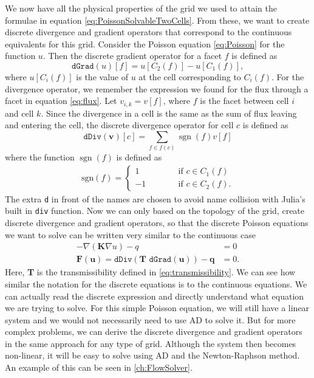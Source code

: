 We now have all the physical properties of the grid we used to attain the formulae in equation \eqref{eq:PoissonSolvableTwoCells}. From these, we want to create discrete divergence and gradient operators that correspond to the continuous equivalents for this grid. Consider the Poisson equation \eqref{eq:Poisson} for the function $u$. Then the discrete gradient operator for a facet $f$ is defined as 
\begin{equation}
    \texttt{dGrad}(u)[f] = u[C_2(f)] - u[C_1(f)], 
    \label{eq:discreteGradient}
\end{equation}
where $u[C_i(f)]$ is the value of $u$ at the cell corresponding to $C_i(f)$. For the divergence operator, we remember the expression we found for the flux through a facet in equation \eqref{eq:flux}. Let $v_{i,k} = v[f]$, where $f$ is the facet between cell $i$ and cell $k$. Since the divergence in a cell is the same as the sum of flux leaving and entering the cell, the discrete divergence operator for cell $c$ is defined as 
\begin{equation*}
    \texttt{dDiv}(\textbf{v})[c] = \sum_{f\in f(c)} \operatorname{sgn}(f)v[f]
\end{equation*}
where the function $\operatorname{sgn}(f)$ is defined as 
\begin{align*}
    \text{sgn}(f) = \left\lbrace
    \begin{array}{rl}
        1 \hspace{3em}&\text{if } c \in C_1(f)\\
        -1 \hspace{3em}&\text{if } c \in C_2(f).
    \end{array}
    \right.
\end{align*}
The extra \texttt{d} in front of the names are chosen to avoid name collision with Julia's built in \texttt{div} function. Now we can only based on the topology of the grid, create discrete divergence and gradient operators, so that the discrete Poisson equations we want to solve can be written very similar to the continuous case
\begin{align*}
    -\nabla(\textbf{K}\nabla u) - q &= 0 \\
    \textbf{F}(\textbf{u}) = \texttt{dDiv}(\textbf{T }\texttt{dGrad}(\textbf{u}))-\textbf{q} &= 0.
\end{align*}
Here, \textbf{T} is the transmissibility defined in \eqref{eq:transmissibility}. We can see how similar the notation for the discrete equations is to the continuous equations. We can actually read the discrete expression and directly understand what equation we are trying to solve. For this simple Poisson equation, we will still have a linear system and we would not necessarily need to use AD to solve it. But for more complex problems, we can derive the discrete divergence and gradient operators in the same approach for any type of grid. Although the system then becomes non-linear, it will be easy to solve using AD and the Newton-Raphson method. An example of this can be seen in \autoref{ch:FlowSolver}.

